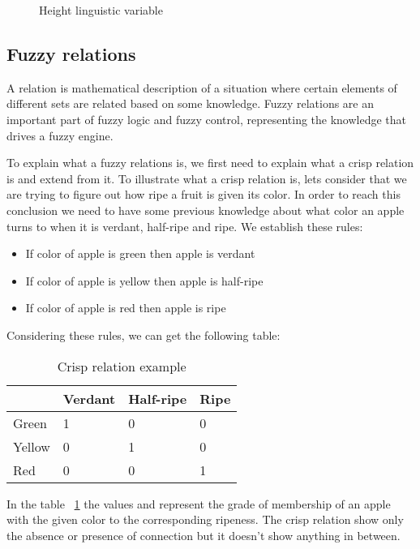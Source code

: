\begin{figure}[h!]
    \centerline{}
    \caption[Height linguistic variable]{Height linguistic variable}
\end{figure}


\subsection{Fuzzy relations}

\qquad A relation is mathematical description of a situation where certain elements of different sets are related
based on some knowledge. Fuzzy relations are an important part of fuzzy logic and fuzzy control, representing
the knowledge that drives a fuzzy engine.

\qquad To explain what a fuzzy relations is, we first need to explain what a crisp relation is and extend from
it. To illustrate what a crisp relation is, lets consider that we are trying to figure out how ripe a fruit is
given its color. In order to reach this conclusion we need to have some previous knowledge about what color
an apple turns to when it is verdant, half-ripe and ripe. We establish these rules:
\begin{itemize}
    \item If color of apple is green then apple is verdant
    \item If color of apple is yellow then apple is half-ripe
    \item If color of apple is red then apple is ripe
\end{itemize}

Considering these rules, we can get the following table:
\begin{center}
    \begin{table}[h!]
    \centering
    \begin{tabular}{| l | l | l | l |}
        \hline
        & Verdant & Half-ripe & Ripe \\ \hline
        Green & 1 & 0 & 0 \\ \hline
        Yellow & 0 & 1 & 0 \\ \hline
        Red & 0 & 0 & 1 \\
        \hline
    \end{tabular}
    \caption[Crisp relation example]{Crisp relation example}
    \label{table:crisp_relation}
    \end{table}
\end{center}

\qquad In the table ~\ref{table:crisp_relation} the values  and  represent the grade of
membership of an apple with the given color to the corresponding ripeness. The crisp relation show only
the absence or presence of connection but it doesn't show anything in between.

